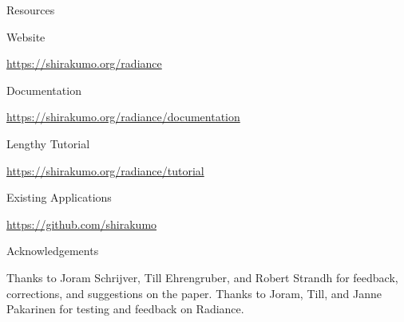 \documentclass[14pt,t]{beamer}
\renewcommand{\title}[1]{
  {\huge #1} \vskip 0.4cm
}
\renewcommand{\subtitle}[1]{
  \vskip 0.3cm {\Large #1} \vskip 0.2cm %
}
\begin{document}
\begin{frame}
  \title{Resources}
  \subtitle{Website}
  {\footnotesize\url{https://shirakumo.org/radiance}}
  \subtitle{Documentation}
  {\footnotesize\url{https://shirakumo.org/radiance/documentation}}
  \subtitle{Lengthy Tutorial}
  {\footnotesize\url{https://shirakumo.org/radiance/tutorial}}
  \subtitle{Existing Applications}
  {\footnotesize\url{https://github.com/shirakumo}}
\end{frame}

\begin{frame}
  \title{Acknowledgements}
  Thanks to Joram Schrijver, Till Ehrengruber, and Robert Strandh for feedback, corrections, and suggestions on the paper. Thanks to Joram, Till, and Janne Pakarinen for testing and feedback on Radiance.
\end{frame}
\end{document}
